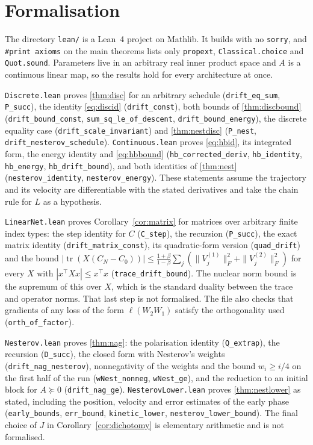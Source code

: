 \documentclass[11pt]{article}
\theoremstyle{remark}
\theoremstyle{definition}
\begin{document}
\section{Formalisation}\label{sec:lean}
{\sloppy

The directory \texttt{lean/} is a Lean~4 project on Mathlib. It builds with no \texttt{sorry}, and \texttt{\#print axioms} on the main theorems lists only \texttt{propext}, \texttt{Classical.choice} and \texttt{Quot.sound}. Parameters live in an arbitrary real inner product space and $A$ is a continuous linear map, so the results hold for every architecture at once.

\texttt{Discrete.lean} proves \cref{thm:disc} for an arbitrary schedule (\texttt{drift\_eq\_sum}, \texttt{P\_succ}), the identity \eqref{eq:discid} (\texttt{drift\_const}), both bounds of \cref{thm:discbound} (\texttt{drift\_bound\_const}, \texttt{sum\_sq\_le\_of\_descent}, \texttt{drift\_bound\_energy}), the discrete equality case (\texttt{drift\_scale\_invariant}) and \cref{thm:nestdisc} (\texttt{P\_nest}, \texttt{drift\_nesterov\_schedule}). \texttt{Continuous.lean} proves \eqref{eq:hbid}, its integrated form, the energy identity and \eqref{eq:hbbound} (\texttt{hb\_corrected\_deriv}, \texttt{hb\_identity}, \texttt{hb\_energy}, \texttt{hb\_drift\_bound}), and both identities of \cref{thm:nest} (\texttt{nesterov\_identity}, \texttt{nesterov\_energy}). These statements assume the trajectory and its velocity are differentiable with the stated derivatives and take the chain rule for $L$ as a hypothesis.

\texttt{LinearNet.lean} proves Corollary~\ref{cor:matrix} for matrices over arbitrary finite index types: the step identity for $C$ (\texttt{C\_step}), the recursion (\texttt{P\_succ}), the exact matrix identity (\texttt{drift\_matrix\_const}), its quadratic-form version (\texttt{quad\_drift}) and the bound $|\operatorname{tr}(X(C_N-C_0))|\le\frac{1+\beta}{1-\beta}\sum_j(\|V^{(1)}_j\|_F^2+\|V^{(2)}_j\|_F^2)$ for every $X$ with $|x^\top Xx|\le x^\top x$ (\texttt{trace\_drift\_bound}). The nuclear norm bound is the supremum of this over $X$, which is the standard duality between the trace and operator norms. That last step is not formalised. The file also checks that gradients of any loss of the form $\ell(W_2W_1)$ satisfy the orthogonality used (\texttt{orth\_of\_factor}).

\texttt{Nesterov.lean} proves \cref{thm:nag}: the polarisation identity (\texttt{Q\_extrap}), the recursion (\texttt{D\_succ}), the closed form with Nesterov's weights (\texttt{drift\_nag\_nesterov}), nonnegativity of the weights and the bound $w_i\ge i/4$ on the first half of the run (\texttt{wNest\_nonneg}, \texttt{wNest\_ge}), and the reduction to an initial block for $A\succeq0$ (\texttt{drift\_nag\_ge}). \texttt{NesterovLower.lean} proves \cref{thm:nestlower} as stated, including the position, velocity and error estimates of the early phase (\texttt{early\_bounds}, \texttt{err\_bound}, \texttt{kinetic\_lower}, \texttt{nesterov\_lower\_bound}). The final choice of $J$ in Corollary~\ref{cor:dichotomy} is elementary arithmetic and is not formalised.

}
\end{document}
